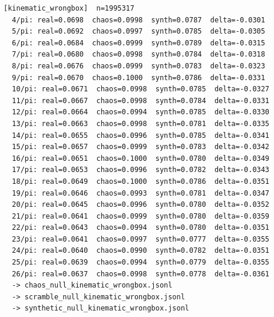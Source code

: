\documentclass[11pt, letterpaper, openany]{book}
\begin{document}
\begin{empiricalbox}
\begin{lstlisting}[style=terminal]
[kinematic_wrongbox]  n=1995317
  4/pi: real=0.0698  chaos=0.0998  synth=0.0787  delta=-0.0301
  5/pi: real=0.0692  chaos=0.0997  synth=0.0785  delta=-0.0305
  6/pi: real=0.0684  chaos=0.0999  synth=0.0789  delta=-0.0315
  7/pi: real=0.0680  chaos=0.0998  synth=0.0784  delta=-0.0318
  8/pi: real=0.0676  chaos=0.0999  synth=0.0783  delta=-0.0323
  9/pi: real=0.0670  chaos=0.1000  synth=0.0786  delta=-0.0331
  10/pi: real=0.0671  chaos=0.0998  synth=0.0785  delta=-0.0327
  11/pi: real=0.0667  chaos=0.0998  synth=0.0784  delta=-0.0331
  12/pi: real=0.0664  chaos=0.0994  synth=0.0785  delta=-0.0330
  13/pi: real=0.0663  chaos=0.0998  synth=0.0781  delta=-0.0335
  14/pi: real=0.0655  chaos=0.0996  synth=0.0785  delta=-0.0341
  15/pi: real=0.0657  chaos=0.0999  synth=0.0783  delta=-0.0342
  16/pi: real=0.0651  chaos=0.1000  synth=0.0780  delta=-0.0349
  17/pi: real=0.0653  chaos=0.0996  synth=0.0782  delta=-0.0343
  18/pi: real=0.0649  chaos=0.1000  synth=0.0786  delta=-0.0351
  19/pi: real=0.0646  chaos=0.0993  synth=0.0781  delta=-0.0347
  20/pi: real=0.0645  chaos=0.0996  synth=0.0780  delta=-0.0352
  21/pi: real=0.0641  chaos=0.0999  synth=0.0780  delta=-0.0359
  22/pi: real=0.0643  chaos=0.0994  synth=0.0780  delta=-0.0351
  23/pi: real=0.0641  chaos=0.0997  synth=0.0777  delta=-0.0355
  24/pi: real=0.0640  chaos=0.0990  synth=0.0782  delta=-0.0351
  25/pi: real=0.0639  chaos=0.0994  synth=0.0779  delta=-0.0355
  26/pi: real=0.0637  chaos=0.0998  synth=0.0778  delta=-0.0361
  -> chaos_null_kinematic_wrongbox.jsonl
  -> scramble_null_kinematic_wrongbox.jsonl
  -> synthetic_null_kinematic_wrongbox.jsonl


\end{lstlisting}
\end{empiricalbox}
\end{document}
